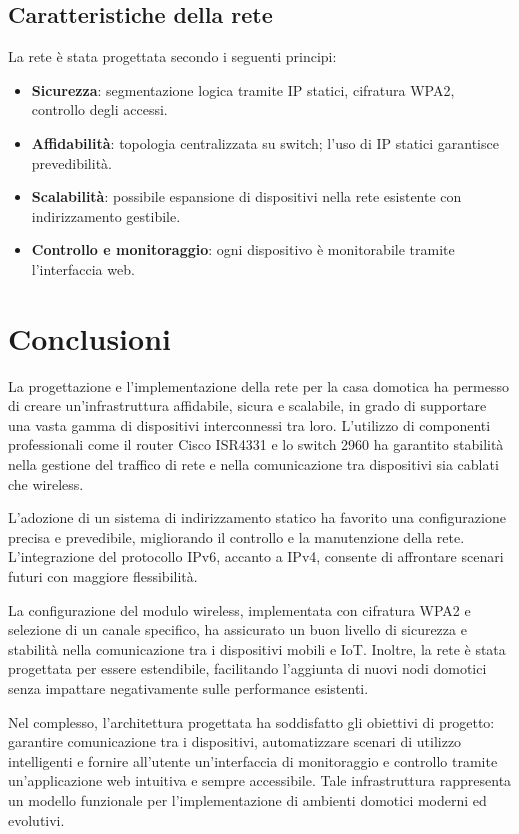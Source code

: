 \documentclass[a4paper,12pt]{article}
\begin{document}
\subsection{Caratteristiche della rete}

La rete è stata progettata secondo i seguenti principi:

\begin{itemize}
    \item \textbf{Sicurezza}: segmentazione logica tramite IP statici, cifratura WPA2, controllo degli accessi.
    \item \textbf{Affidabilità}: topologia centralizzata su switch; l’uso di IP statici garantisce prevedibilità.
    \item \textbf{Scalabilità}: possibile espansione di dispositivi nella rete esistente con indirizzamento gestibile.
    \item \textbf{Controllo e monitoraggio}: ogni dispositivo è monitorabile tramite l’interfaccia web.
\end{itemize}

\section*{Conclusioni}

La progettazione e l’implementazione della rete per la casa domotica ha permesso di creare un’infrastruttura affidabile, sicura e scalabile, in grado di supportare una vasta gamma di dispositivi interconnessi tra loro. L’utilizzo di componenti professionali come il router Cisco ISR4331 e lo switch 2960 ha garantito stabilità nella gestione del traffico di rete e nella comunicazione tra dispositivi sia cablati che wireless.

L’adozione di un sistema di indirizzamento statico ha favorito una configurazione precisa e prevedibile, migliorando il controllo e la manutenzione della rete. L’integrazione del protocollo IPv6, accanto a IPv4, consente di affrontare scenari futuri con maggiore flessibilità.

La configurazione del modulo wireless, implementata con cifratura WPA2 e selezione di un canale specifico, ha assicurato un buon livello di sicurezza e stabilità nella comunicazione tra i dispositivi mobili e IoT. Inoltre, la rete è stata progettata per essere estendibile, facilitando l’aggiunta di nuovi nodi domotici senza impattare negativamente sulle performance esistenti.

Nel complesso, l’architettura progettata ha soddisfatto gli obiettivi di progetto: garantire comunicazione tra i dispositivi, automatizzare scenari di utilizzo intelligenti e fornire all’utente un’interfaccia di monitoraggio e controllo tramite un’applicazione web intuitiva e sempre accessibile. Tale infrastruttura rappresenta un modello funzionale per l’implementazione di ambienti domotici moderni ed evolutivi.
\end{document}
